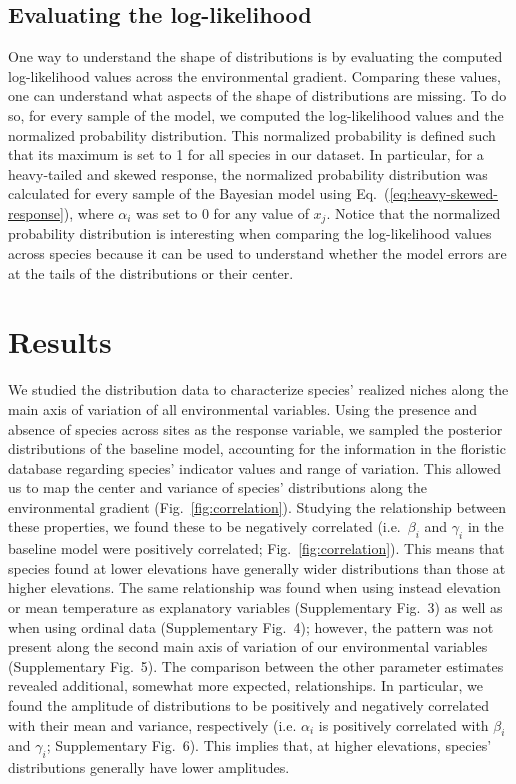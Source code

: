 \documentclass[11pt, a4paper]{article}
\begin{document}
\subsection*{Evaluating the log-likelihood}
One way to understand the shape of distributions is by evaluating the computed log-likelihood values across the environmental gradient. Comparing these values, one can understand what aspects of the shape of distributions are missing. To do so, for every sample of the model, we computed the log-likelihood values and the normalized probability distribution. This normalized probability is defined such that its maximum is set to 1 for all species in our dataset. In particular, for a heavy-tailed and skewed response, the normalized probability distribution was calculated for every sample of the Bayesian model using Eq.~(\ref{eq:heavy-skewed-response}), where $\alpha_i$ was set to 0 for any value of $x_{j}$. Notice that the normalized probability distribution is interesting when comparing the log-likelihood values across species because it can be used to understand whether the model errors are at the tails of the distributions or their center. 

\section*{Results}
We studied the distribution data to characterize species' realized niches along the main axis of variation of all environmental variables. Using the presence and absence of species across sites as the response variable, we sampled the posterior distributions of the baseline model, accounting for the information in the floristic database regarding species' indicator values and range of variation. This allowed us to map the center and variance of species' distributions along the environmental gradient (Fig.~\ref{fig:correlation}).  Studying the relationship between these properties, we found these to be negatively correlated (i.e.~$\beta_{i}$ and $\gamma_{i}$ in the baseline model were positively correlated; Fig.~\ref{fig:correlation}). This means that species found at lower elevations have generally wider distributions than those at higher elevations. The same relationship was found when using instead elevation or mean temperature as explanatory variables (Supplementary Fig.~3) as well as when using ordinal data (Supplementary Fig.~4); however, the pattern was not present along the second main axis of variation of our environmental variables (Supplementary Fig.~5). The comparison between the other parameter estimates revealed additional, somewhat more expected, relationships. In particular, we found the amplitude of distributions to be positively and negatively correlated with their mean and variance, respectively (i.e. $\alpha_{i}$ is positively correlated with $\beta_{i}$ and $\gamma_{i}$; Supplementary Fig.~6). This implies that, at higher elevations, species' distributions generally have lower amplitudes.
\end{document}
